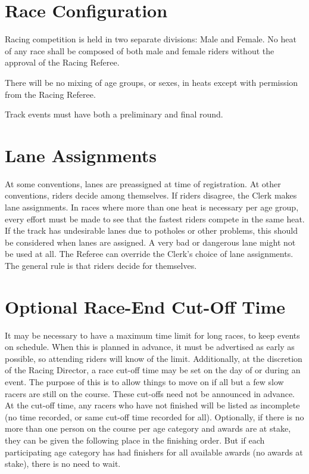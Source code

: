 \section{Race Configuration}

Racing competition is held in two separate divisions: Male and Female.
No heat of any race shall be composed of both male and female riders without the approval of the Racing Referee.

There will be no mixing of age groups, or sexes, in heats except with permission from the Racing Referee.

Track events must have both a preliminary and final round.

\section{Lane Assignments}

At some conventions, lanes are preassigned at time of registration.
At other conventions, riders decide among themselves.
If riders disagree, the Clerk makes lane assignments.
In races where more than one heat is necessary per age group, every effort must be made to see that the fastest riders compete in the same heat.
If the track has undesirable lanes due to potholes or other problems, this should be considered when lanes are assigned.
A very bad or dangerous lane might not be used at all.
The Referee can override the Clerk's choice of lane assignments.
The general rule is that riders decide for themselves.

\section{Optional Race-End Cut-Off Time}
It may be necessary to have a maximum time limit for long races, to keep events on schedule.
When this is planned in advance, it must be advertised as early as possible, so attending riders will know of the limit.
Additionally, at the discretion of the Racing Director, a race cut-off time may be set on the day of or during an event.
The purpose of this is to allow things to move on if all but a few slow racers are still on the course.
These cut-offs need not be announced in advance.
At the cut-off time, any racers who have not finished will be listed as incomplete (no time recorded, or same cut-off time recorded for all).
Optionally, if there is no more than one person on the course per age category and awards are at stake, they can be given the following place in the finishing order.
But if each participating age category has had finishers for all available awards (no awards at stake), there is no need to wait.
